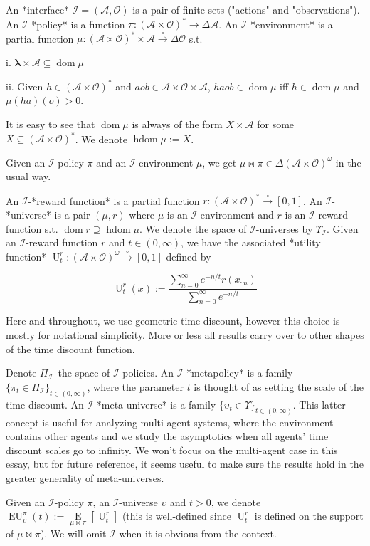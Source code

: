 \documentclass[a4paper]{article}
\DeclareMathOperator{\Dom}{dom}
\newcommand{\E}[1]{\underset{#1}{\operatorname{E}}}
\newcommand{\Estr}{\boldsymbol{\lambda}}
\newcommand{\PF}{\xrightarrow{\circ}}
\newcommand{\Ob}{\mathcal{O}}
\newcommand{\A}{\mathcal{A}}
\newcommand{\I}{\mathcal{I}}
\newcommand{\FH}{(\A \times \Ob)^*}
\newcommand{\IH}{(\A \times \Ob)^\omega}
\DeclareMathOperator{\HD}{hdom}
\newcommand{\Ut}{\operatorname{U}}
\newcommand{\EU}{\operatorname{EU}}
\begin{document}
An *interface* $\I = (\A,\Ob)$ is a pair of finite sets  ("actions" and "observations"). An $\I$-*policy* is a function $\pi: \FH \rightarrow \Delta\A$. An $\I$-*environment* is a partial function $\mu: \FH \times \A \PF \Delta\Ob$ s.t. 

i. $\Estr \times \A \subseteq \Dom \mu$

ii. Given $h \in \FH$ and $aob \in \A \times \Ob \times \A$, $haob \in \Dom \mu$ iff $h \in \Dom \mu$ and $\mu(ha)(o) > 0$.

It is easy to see that $\Dom \mu$ is always of the form $X \times \A$ for some $X \subseteq \FH$. We denote $\HD \mu := X$.

Given an $\I$-policy $\pi$ and an $\I$-environment $\mu$, we get $\mu\bowtie\pi \in \Delta\IH$ in the usual way.

An $\I$-*reward function* is a partial function $r: (\A \times \Ob)^* \PF [0,1]$. An $\I$-*universe* is a pair $(\mu,r)$ where $\mu$ is an $\I$-environment and $r$ is an $\I$-reward function s.t. $\Dom{r} \supseteq \HD{\mu}$. We denote the space of $\I$-universes by $\Upsilon_\I$. Given an $\I$-reward function $r$ and $t \in (0,\infty)$, we have the associated *utility function* $\Ut_t^r: \IH \PF [0,1]$ defined by

$$\Ut_t^{r}(x):=\frac{\sum_{n=0}^\infty e^{-n/t} r(x_{:n})}{\sum_{n=0}^\infty e^{-n/t}}$$

Here and throughout, we use geometric time discount, however this choice is mostly for notational simplicity. More or less all results carry over to other shapes of the time discount function.

Denote $\Pi_{\I}$\ the space of $\I$-policies. An $\I$-*metapolicy* is a family $\{\pi_t \in \Pi_\I\}_{t \in (0, \infty)}$, where the parameter $t$ is thought of as setting the scale of the time discount. An $\I$-*meta-universe* is a family $\{\upsilon_t \in \Upsilon\}_{t \in (0, \infty)}$. This latter concept is useful for analyzing multi-agent systems, where the environment contains other agents and we study the asymptotics when all agents' time discount scales go to infinity. We won't focus on the multi-agent case in this essay, but for future reference, it seems useful to make sure the results hold in the greater generality of meta-universes.

Given an $\I$-policy $\pi$, an $\I$-universe $\upsilon$ and $t > 0$, we denote $\EU_\upsilon^\pi(t):=\E{\mu\bowtie\pi}[\Ut^r_t]$ (this is well-defined since $\Ut^r_t$ is defined on the support of $\mu\bowtie\pi$). We will omit $\I$ when it is obvious from the context.
\end{document}

